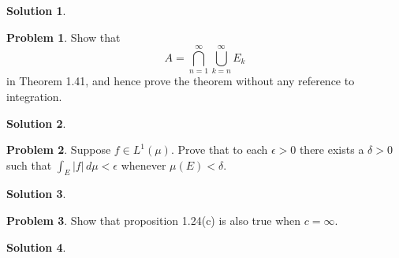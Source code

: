 \documentclass[12pt]{article}
\theoremstyle{definition} %
\newtheorem{solution}{Solution}
\newtheorem{problem}{Problem}
\theoremstyle{plain} %
\begin{document}
\begin{solution}
  
\end{solution}
\begin{problem}
  Show that
  \[
  A = \bigcap_{n=1}^{\infty} \bigcup_{k=n}^{\infty} E_k
  \]
  in Theorem 1.41, and hence prove the theorem without any reference to integration.
  \end{problem}
\begin{solution}
  
\end{solution}
\begin{problem}
  Suppose $f \in L^1(\mu)$. Prove that to each $\epsilon > 0$ there exists a $\delta > 0$ such that $\int_E |f|\, d\mu < \epsilon$ whenever $\mu(E) < \delta$.
  \end{problem}
\begin{solution}
  
\end{solution}
\begin{problem}
  Show that proposition 1.24(c) is also true when $c = \infty$.
  \end{problem}
\begin{solution}
  
\end{solution}
\end{document}
